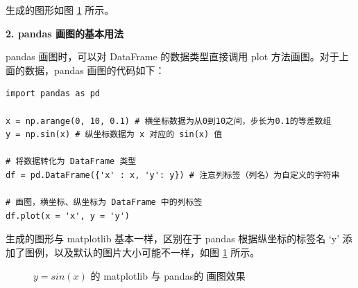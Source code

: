 生成的图形如图 \ref{fig:sinx} 所示。


\vspace{3pt}
\noindent\textbf{2. pandas 画图的基本用法}
\vspace{3pt}

pandas 画图时，可以对 DataFrame 的数据类型直接调用 plot 方法画图。对于上面的数据，pandas 画图的代码如下：

\begin{lstlisting}[Language=Python]
import pandas as pd

x = np.arange(0, 10, 0.1) # 横坐标数据为从0到10之间，步长为0.1的等差数组
y = np.sin(x) # 纵坐标数据为 x 对应的 sin(x) 值

# 将数据转化为 DataFrame 类型
df = pd.DataFrame({'x' : x, 'y': y}) # 注意列标签（列名）为自定义的字符串

# 画图，横坐标、纵坐标为 DataFrame 中的列标签
df.plot(x = 'x', y = 'y')
\end{lstlisting}

生成的图形与 matplotlib 基本一样，区别在于 pandas 根据纵坐标的标签名 `y' 添加了图例，以及默认的图片大小可能不一样，如图 \ref{fig:sinx} 所示。

\begin{figure}[ht]
  \centering
  \caption{$y=sin(x)$ 的 matplotlib 与 pandas的 画图效果}\label{fig:sinx}

\end{figure}

